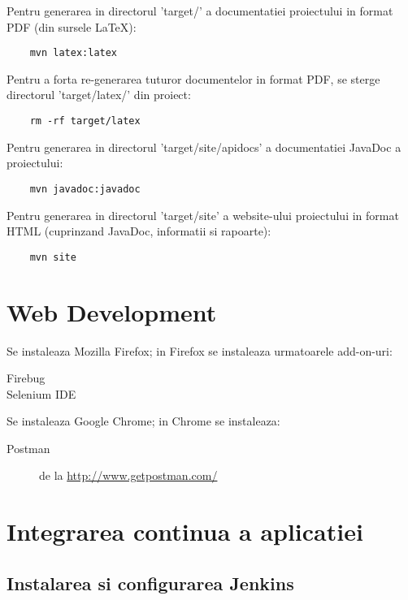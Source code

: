 Pentru generarea in directorul 'target/' a documentatiei proiectului in format PDF (din sursele LaTeX):

\begin{lstlisting}
	mvn latex:latex
\end{lstlisting}

Pentru a forta re-generarea tuturor documentelor in format PDF, se sterge directorul 'target/latex/' din proiect:

\begin{lstlisting}
	rm -rf target/latex
\end{lstlisting}

Pentru generarea in directorul 'target/site/apidocs' a documentatiei JavaDoc a proiectului:

\begin{lstlisting}
	mvn javadoc:javadoc
\end{lstlisting}

Pentru generarea in directorul 'target/site' a website-ului proiectului in format HTML (cuprinzand JavaDoc, informatii si rapoarte):

\begin{lstlisting}
	mvn site
\end{lstlisting}

\section{Web Development}
Se instaleaza Mozilla Firefox; in Firefox se instaleaza urmatoarele add-on-uri:
\begin{description}
\item [Firebug]
\item [Selenium IDE]
\end{description}

Se instaleaza Google Chrome; in Chrome se instaleaza:
\begin{description}
\item [Postman] de la \url{http://www.getpostman.com/}
\end{description}


\section{Integrarea continua a aplicatiei}

\subsection{Instalarea si configurarea Jenkins}

